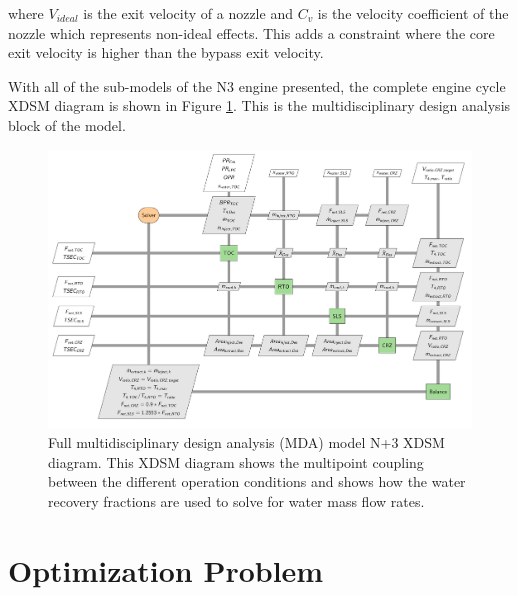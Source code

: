 \documentclass[conf]{new-aiaa}
\begin{document}
\noindent
where $V_{ideal}$ is the exit velocity of a nozzle and $C_v$ is the velocity coefficient of the nozzle which represents non-ideal effects.
This adds a constraint where the core exit velocity is higher than the bypass exit velocity.


With all of the sub-models of the N3 engine presented, the complete engine cycle XDSM diagram is shown in Figure \ref{fig:N3_xdsm_full}.
This is the multidisciplinary design analysis block of the model.

\begin{figure}[hbt!]
    \centering
    \includegraphics[width=1.0\textwidth]{N3_xdsm_full.pdf}
    \caption{
        Full multidisciplinary design analysis (MDA) model N+3 XDSM diagram.
        This XDSM diagram shows the multipoint coupling between the different operation conditions and shows how the water recovery fractions are used to solve for water mass flow rates.
    }
    \label{fig:N3_xdsm_full}
\end{figure}

\section{Optimization Problem}
\label{sec:optprob}
\end{document}
